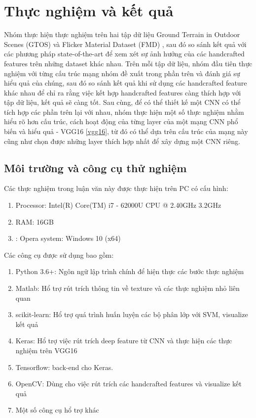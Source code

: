 \chapter{Thực nghiệm và kết quả}
\ifpdf
    \graphicspath{{Chapter5/Chapter5Figs/PNG/}{Chapter5/Chapter5Figs/PDF/}{Chapter5/Chapter5Figs/}}
\else
    \graphicspath{{Chapter5/Chapter5Figs/EPS/}{Chapter5/Chapter5Figs/}}
\fi

Nhóm thực hiện thực nghiệm trên hai tập dữ liệu Ground Terrain in Outdoor Scenes (GTOS) \cite{xue2017differential} và Flicker Material Dataset (FMD) \cite{degol2016geometry}, sau đó so sánh kết quả với các phương pháp state-of-the-art để xem xét sự ảnh hưởng của các handcrafted features trên những dataset khác nhau.
Trên mỗi tập dữ liệu, nhóm đầu tiên thực nghiệm với từng cấu trúc mạng nhóm đề xuất trong phần trên và đánh giá sự hiểu quả của chúng, sau đó so sánh kết quả khi sử dụng các handcrafted feature khác nhau để chỉ ra rằng việc kết hợp handcrafted features càng thích hợp với tập dữ liệu, kết quả sẽ càng tốt. Sau cùng, để có thể thiết kế một CNN có thể tích hợp các phần trên lại với nhau, nhóm thực hiện một số thực nghiệm nhằm hiểu rõ hơn cấu trúc, cách hoạt động của từng layer của một mạng CNN phổ biến và hiểu quả - VGG16 \ref{vgg16}, từ đó có thể dựa trên cấu trúc của mạng này cũng như chọn được những layer thích hợp nhất để xây dựng một CNN riêng.

\section{Môi trường và công cụ thử nghiệm}
Các thực nghiệm trong luận văn này được thực hiện trên PC có cấu hình:
\begin{enumerate}
\item Processor: Intel(R) Core(TM) i7 - 62000U CPU @ 2.40GHz 3.2GHz
\item RAM: 16GB
\item: Opera system: Windows 10 (x64)
\end{enumerate}
Các công cụ được sử dụng bao gồm:
\begin{enumerate}
\item Python 3.6+: Ngôn ngữ lập trình chính để hiện thực các bước thực nghiệm
\item Matlab: Hổ trợ rút trích thông tin về texture và các thực nghiệm nhỏ liên quan
\item scikit-learn: Hổ trợ quá trình huấn luyện các bộ phân lớp với SVM, visualize kết quả 
\item Keras: Hổ trợ việc rút trích deep feature từ CNN và thực hiện các thực nghiệm trên VGG16
\item Tensorflow: back-end cho Keras.
\item OpenCV: Dùng cho việc rút trích các handcrafted features và visualize kết quả
\item Một số công cụ hổ trợ khác
\end{enumerate}

